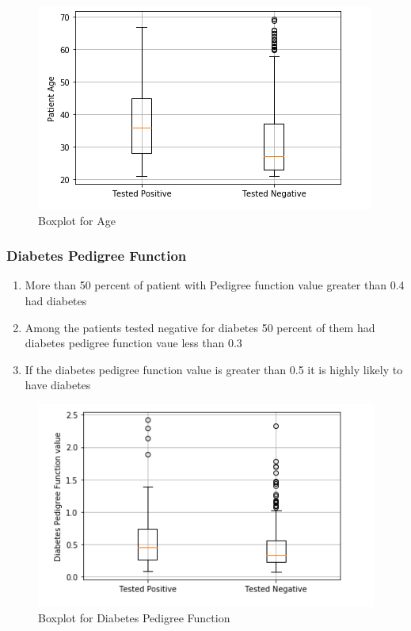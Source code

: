 \documentclass[12pt]{article}
\begin{document}
\begin{figure}[h]
\centering
\includegraphics[scale=0.7]{boxplot_age.PNG} 
\caption{Boxplot for Age}
\label{etiqueta}
\end{figure}

\subsubsection{Diabetes Pedigree Function}

\begin{enumerate}
\item More than 50 percent of patient with Pedigree function value greater than 0.4 had diabetes
\item Among the patients tested negative for diabetes 50 percent of them had diabetes pedigree function vaue less than 0.3
\item If the diabetes pedigree function value is greater than 0.5 it is highly likely to have diabetes
\end{enumerate}

\begin{figure}[h]
\centering
\includegraphics[scale=0.7]{boxplot_func.PNG} 
\caption{Boxplot for Diabetes Pedigree Function}
\label{etiqueta}
\end{figure}
\end{document}
